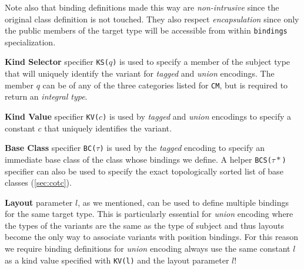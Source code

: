 \documentclass[preprint]{sigplanconf}
\makeatletter
\DeclareRobustCommand{\code}[1]{{\lstinline[breaklines=false,escapechar=@]{#1}}}
\makeatother
\begin{document}
Note also that binding definitions made this way are \emph{non-intrusive} since the 
original class definition is not touched. They also respect \emph{encapsulation} 
since only the public members of the target type will be accessible from within 
\code{bindings} specialization.

{\bf Kind Selector} specifier \code{KS(}$q$\code{)} is used to specify a member 
of the subject type that will uniquely identify the variant for \emph{tagged} 
and \emph{union} encodings. The member $q$ can be of any of the three categories 
listed for \code{CM}, but is required to return an \emph{integral type}.

{\bf Kind Value} specifier \code{KV(}$c$\code{)} is used by \emph{tagged} and 
\emph{union} encodings to specify a constant $c$ that uniquely identifies the 
variant.

{\bf Base Class} specifier \code{BC(}$\tau$\code{)} is used by the \emph{tagged}
encoding to specify an immediate base class of the class whose bindings we 
define. A helper \code{BCS(}$\tau*$\code{)} specifier can also be used to 
specify the exact topologically sorted list of base classes 
(\textsection\ref{sec:cotc}).

{\bf Layout} parameter $l$, as we mentioned, can be used to define multiple bindings for the same 
target type. This is particularly essential for \emph{union} encoding where the 
types of the variants are the same as the type of subject and thus layouts 
become the only way to associate variants with position bindings. For this 
reason we require binding definitions for \emph{union} encoding always use the 
same constant $l$ as a kind value specified with \code{KV(l)} and the layout 
parameter $l$!

\end{document}
